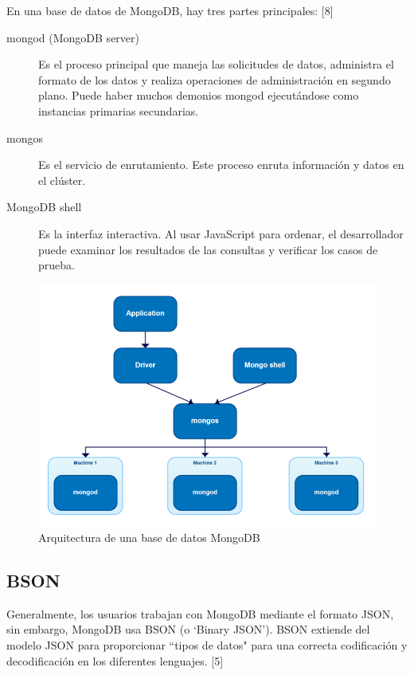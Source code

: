 \documentclass[twocolumn]{article}
\begin{document}
En una base de datos de MongoDB, hay tres partes principales: [8]

\begin{description}
  \item[mongod (MongoDB server)] Es el proceso principal que maneja las solicitudes de datos, administra el formato de los datos y realiza operaciones de administración en segundo plano. Puede haber muchos demonios mongod ejecutándose como instancias primarias secundarias.
  \item[mongos] Es el servicio de enrutamiento. Este proceso enruta información y datos en el clúster.
  \item[MongoDB shell] Es la interfaz interactiva. Al usar JavaScript para ordenar, el desarrollador puede examinar los resultados de las consultas y verificar los casos de prueba.
\end{description}

\begin{figure}[h]
  \includegraphics[width = \columnwidth]{img/01_mongo.png}
  \caption{Arquitectura de una base de datos MongoDB}
\end{figure}

\subsection{BSON}

Generalmente, los usuarios trabajan con MongoDB mediante el formato JSON, sin embargo, MongoDB usa BSON (o `Binary JSON'). BSON extiende del modelo JSON para proporcionar ``tipos de datos" para una correcta codificación y decodificación en los diferentes lenguajes. [5]
\end{document}
